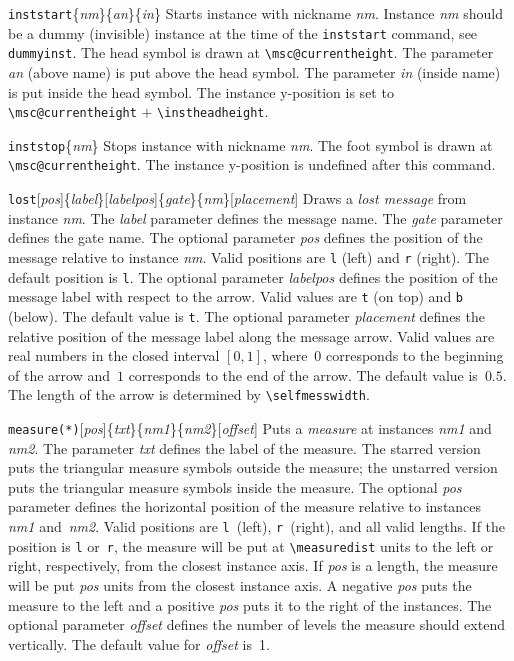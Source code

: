 \documentclass[a4paper]{article}
\newcommand{\cmd}[1]{\texttt{\bslash #1}}
\newcommand{\opt}[1]{[#1]}
\newenvironment{defs}{%
  \begin{list}{}%
              {\setlength{\labelwidth}{0pt}%
               \setlength{\labelsep}{1em}%
               \setlength{\leftmargin}{1em}%
               \setlength{\parsep}{1ex}%
               \setlength{\listparindent}{0pt}%
               \setlength{\rightmargin}{0pt}%
               \renewcommand{\makelabel}[1]{##1}%
               \raggedright%
              }%
  }{%
  \end{list}}
\begin{document}
\begin{defs}
\item[\cmd{inststart}\{\emph{nm}\}\{\emph{an}\}\{\emph{in}\}] Starts
instance with nickname \emph{nm}. Instance \emph{nm} should be a dummy
(invisible) instance at the time of the \cmd{inststart} command, see
\cmd{dummyinst}.  The head symbol is drawn at
\verb|\msc@currentheight|. The parameter \emph{an} (above name) is put
above the head symbol. The parameter \emph{in} (inside name) is put
inside the head symbol. The instance y-position is set to
\verb|\msc@currentheight| $+$ \verb|\instheadheight|.

\item[\cmd{inststop}\{\emph{nm}\}] Stops instance with nickname
\emph{nm}. The foot symbol is drawn at \verb|\msc@currentheight|. The
instance y-position is undefined after this command.

\item[\cmd{lost}\opt{\emph{pos}}\{\emph{label}\}\opt{\emph{labelpos}}\{\emph{gate}\}\{\emph{nm}\}\opt{\emph{placement}}]
Draws a \emph{lost message} from instance \emph{nm}. The \emph{label}
parameter defines the message name. The \emph{gate} parameter defines
the gate name.  The optional parameter \emph{pos} defines the position
of the message relative to instance \emph{nm}. Valid positions are
\verb|l| (left) and \verb|r| (right). The default position is
\verb|l|.  The optional parameter \emph{labelpos} defines the position
of the message label with respect to the arrow. Valid values are
\verb+t+ (on top) and \verb+b+ (below). The default value is \verb+t+.
The optional parameter \emph{placement} defines the relative position
of the message label along the message arrow. Valid values are real
numbers in the closed interval $[0,1]$, where~$0$ corresponds to the
beginning of the arrow and~$1$ corresponds to the end of the
arrow. The default value is~$0.5$. The length of the arrow is
determined by \verb+\selfmesswidth+.

\item[\cmd{measure(*)}\opt{\emph{pos}}\{\emph{txt}\}\{\emph{nm1}\}\{\emph{nm2}\}\opt{\emph{offset}}]
Puts a \emph{measure} at instances \emph{nm1} and \emph{nm2}. The
parameter \emph{txt} defines the label of the measure. The starred
version puts the triangular measure symbols outside the measure; the
unstarred version puts the triangular measure symbols inside the
measure.  The optional \emph{pos} parameter defines the horizontal
position of the measure relative to instances \emph{nm1}
and~\emph{nm2}. Valid positions are \verb|l|~(left), \verb|r|~(right),
and all valid lengths. If the position is \verb|l| or~\verb|r|, the
measure will be put at \verb|\measuredist| units to the left or right,
respectively, from the closest instance axis. If \emph{pos} is a
length, the measure will be put \emph{pos} units from the closest
instance axis. A negative \emph{pos} puts the measure to the left and
a positive \emph{pos} puts it to the right of the instances. The
optional parameter \emph{offset} defines the number of levels the
measure should extend vertically. The default value for \emph{offset}
is~1.



\end{defs}
\end{document}

